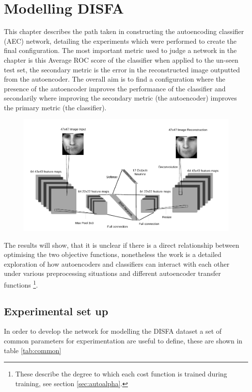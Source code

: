 \chapter{Modelling DISFA} \label{sec:model}
  This chapter describes the path taken in constructing the autoencoding classifier (AEC) network, detailing
  the experiments which were performed to create the final configuration.
  The most important metric used to judge a network in the chapter is this Average ROC score of the classifier
  when applied to the un-seen test set, the secondary metric is the error
  in the reconstructed image outputted from the autoencoder. The overall aim is to
  find a configuration where the presence of the autoencoder improves
  the performance of the classifier and secondarily where improving the secondary metric (the autoencoder) improves
  the primary metric (the classifier).

  \begin{figure}[h!]
   \centering
   \includegraphics[width=\textwidth]{illustrations/aec_network.pdf}
  \end{figure}

  The results will show, that it is unclear if there is a direct relationship between optimising the two objective functions, nonetheless
  the work is a detailed exploration of how autoencoders and classifiers can interact with each other
  under various preprocessing situations and different autoencoder transfer functions \footnote{These describe the degree to which
  each cost function is trained during training, see section \ref{sec:autoalpha}.}.

  \section{Experimental set up}
    In order to develop the network for modelling the DISFA dataset a set of common
    parameters for experimentation are useful to define, these are shown in table \ref{tab:common}

